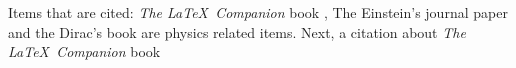 Items that are cited: \textit{The \LaTeX\ Companion} book \cite{latexcompanion}, The Einstein's journal paper \cite{einstein} and the Dirac's book \cite{dirac} are physics related items. Next, a citation about \textit{The \LaTeX\ Companion} book \cite{latexcompanion} \cite{Koppe}
\cite{Koppe2}





